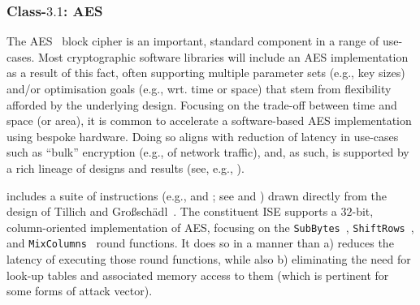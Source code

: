 \subsubsection{Class-$3.1$: AES}
\label{sec:bg:feature:3:1}

The 
AES~\cite{SCARV:FIPS:197} 
block cipher is an important, standard component in a range of use-cases.  
Most cryptographic software libraries will include an AES implementation 
as a result of this fact, often supporting multiple 
parameter sets     (e.g., key sizes)
and/or
optimisation goals (e.g., wrt. time or space)
that stem from flexibility afforded by the underlying design.
Focusing on the trade-off between time and space (or area), it is common
to accelerate a software-based AES implementation using bespoke hardware.
Doing so aligns with reduction of latency in use-cases such as ``bulk''
encryption (e.g., of network traffic), and, as such, is supported by a
rich lineage of designs and results (see, e.g., ).

\XCID includes a suite of instructions 
(e.g.,  and ; see  and )
drawn directly from the design of
Tillich and Gro{\ss}sch\"{a}dl~\cite{SCARV:TilGro:06}.
The constituent ISE supports a $32$-bit, column-oriented implementation 
of AES, focusing on the
{\tt SubBytes}~\cite[Section 5.1.1]{SCARV:FIPS:197},
{\tt ShiftRows}~\cite[Section 5.1.2]{SCARV:FIPS:197}, 
and
{\tt MixColumns}~\cite[Section 5.1.3]{SCARV:FIPS:197}
round functions.  It does so in a manner than 
a) reduces the latency of executing those round functions, 
   while also
b) eliminating the need for look-up tables and associated memory access
   to them (which is pertinent for some forms of attack vector).

